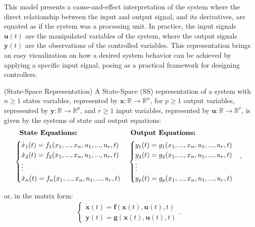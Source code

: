 \documentclass[a4paper,11pt]{book}
\numberwithin{figure}{chapter}
\numberwithin{equation}{chapter}
\numberwithin{table}{chapter}
\theoremstyle{definition}
\newtheorem{definition}{Definition}[chapter]
\newcounter{boxed-theorem}
\newcounter{boxed-definition}
\newenvironment{boxed-definition}[1]
{\begin{shaded} \begin{definition}{#1}}
{\end{definition} \end{shaded}}
\begin{document}
This model presents a cause-and-effect interpretation of the system where the direct relationship between the input and output signal, and its derivatives, are equated as if the system was a processing unit. In practice, the input signals $\bm{u}(t)$ are the manipulated variables of the system, where the output signals $\bm{y}(t)$ are the observations of the controlled variables. This representation brings an easy visualization on how a desired system behavior can be achieved by applying a specific input signal, posing as a practical framework for designing controllers. 

\begin{boxed-definition}{(State-Space Representation)} \label{th:SSRepr01}
    A State-Space (SS) representation of a system with $n \geq 1$ states variables, represented by $\bm{x} : \mathbb{R} \rightarrow \mathbb{R}^{n}$, for $p \geq 1$ output variables, represented by $\bm{y} : \mathbb{R} \rightarrow \mathbb{R}^{p}$, and $r \geq 1$ input variables, represented by $\bm{u} : \mathbb{R} \rightarrow \mathbb{R}^{r}$, is given by the systems of state and output equations:
    \begin{align} \label{eq:SSRepr01}
    \begin{split}
    \textbf{State Equations:}\ \ \ \ \ \ \ \ \ \ \ \ \ \ \ \ \ \ \ \ \ \  \hfill & \textbf{ Output Equations:} \hfill \\
    \begin{cases}
        \dot{x}_1(t) = f_1(x_1, ..., x_n, u_1, ..., u_r, t) \\
        \dot{x}_2(t) = f_2(x_1, ..., x_n, u_1, ..., u_r, t) \\
        \vdots \\
        \dot{x}_n(t) = f_n(x_1, ..., x_n, u_1, ..., u_r, t)
    \end{cases} \hfill & \begin{cases}
        y_1(t) = g_1(x_1, ..., x_n, u_1, ..., u_r, t) \\
        y_2(t) = g_2(x_1, ..., x_n, u_1, ..., u_r, t) \\
        \vdots \\
        y_p(t) = g_p(x_1, ..., x_n, u_1, ..., u_r, t) \hfill
    \end{cases}
    \end{split}
    ,\end{align}
    
    \noindent or, in the matrix form:
    \begin{align} \label{eq:SSRepr02}
    \begin{cases}
        \dot{\bm{x}}(t) = \bm{f}(\bm{x}(t), \bm{u}(t), t) \\
        \bm{y}(t) = \bm{g}(\bm{x}(t), \bm{u}(t), t)
    \end{cases}
    .\end{align}
\end{boxed-definition}
\end{document}

